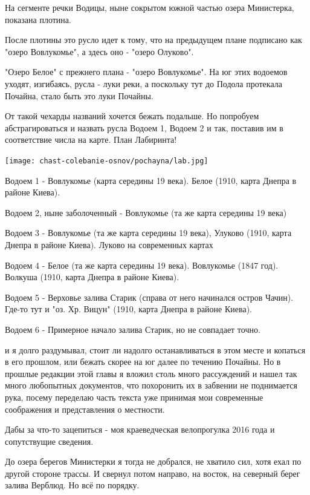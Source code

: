 На сегменте речки Водицы, ныне сокрытом южной частью озера Министерка, показана плотина.

После плотины это русло идет к тому, что на предыдущем плане подписано как "озеро Вовлукомье", а здесь оно - "озеро Олуково".

"Озеро Белое" с прежнего плана - "озеро Вовлукомье". На юг этих водоемов уходят, изгибаясь, русла - луки реки, а поскольку тут до Подола протекала Почайна, стало быть это луки Почайны.

От такой чехарды названий хочется бежать подальше. Но попробуем абстрагироваться и назвать русла Водоем 1, Водоем 2 и так, поставив им в соответствие числа на карте. План  Лабиринта!

\begin{center}
\texttt{[image: chast-colebanie-osnov/pochayna/lab.jpg]}
\end{center}

Водоем 1 - Вовлукомье (карта середины 19 века). Белое (1910, карта Днепра в районе Киева).

Водоем 2, ныне заболоченный - Вовлукомье (та же карта середины 19 века)

Водоем 3 - Вовлукомье (та же карта середины 19 века), Улуково (1910, карта Днепра в районе Киева). Луково на современных картах

Водоем 4 - Белое (та же карта середины 19 века). Вовлукомье (1847 год). Волкуша (1910, карта Днепра в районе Киева).

Водоем 5 - Верховье залива Старик (справа от него начинался остров Чачин). Где-то тут и "оз. Хр. Вицун" (1910, карта Днепра в районе Киева).

Водоем 6 - Примерное начало залива Старик, но не совпадает точно. 

 и я долго раздумывал, стоит ли надолго останавливаться в этом месте и копаться в его прошлом, или бежать скорее на юг далее по течению Почайны. Но в прошлые редакции этой главы я вложил столь много рассуждений и нашел так много любопытных документов, что похоронить их в забвении не поднимается рука, посему переделаю часть текста уже принимая мои современные соображения и представления о местности. 

Дабы за что-то зацепиться - моя краеведческая велопрогулка 2016 года и сопутствущие сведения. 

До озера берегов Министерки я тогда не добрался, не хватило сил, хотя ехал по другой стороне трассы. И свернул потом направо, на восток, на северный берег залива Верблюд. Но всё по порядку.

